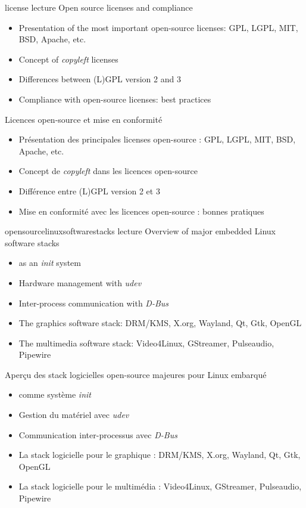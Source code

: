 {license}
{lecture}
{Open source licenses and compliance}
{
  \begin{itemize}
  \item Presentation of the most important open-source licenses: GPL,
    LGPL, MIT, BSD, Apache, etc.
  \item Concept of {\em copyleft} licenses
  \item Differences between (L)GPL version 2 and 3
  \item Compliance with open-source licenses: best practices
  \end{itemize}
}
{Licences open-source et mise en conformité}
{
  \begin{itemize}
  \item Présentation des principales licenses open-source : GPL, LGPL,
    MIT, BSD, Apache, etc.
  \item Concept de {\em copyleft} dans les licences open-source
  \item Différence entre (L)GPL version 2 et 3
  \item Mise en conformité avec les licences open-source : bonnes
    pratiques
  \end{itemize}
}
{opensourcelinuxsoftwarestacks}
{lecture}
{Overview of major embedded Linux software stacks}
{
  \begin{itemize}
  \item {} as an {\em init} system
  \item Hardware management with {\em udev}
  \item Inter-process communication with {\em D-Bus}
  \item The graphics software stack: DRM/KMS, X.org, Wayland, Qt, Gtk,
    OpenGL
  \item The multimedia software stack: Video4Linux, GStreamer,
    Pulseaudio, Pipewire
  \end{itemize}
}
{Aperçu des stack logicielles open-source majeures pour Linux embarqué}
{
  \begin{itemize}
  \item {} comme système {\em init}
  \item Gestion du matériel avec {\em udev}
  \item Communication inter-processus avec {\em D-Bus}
  \item La stack logicielle pour le graphique : DRM/KMS, X.org,
    Wayland, Qt, Gtk, OpenGL
  \item La stack logicielle pour le multimédia : Video4Linux,
    GStreamer, Pulseaudio, Pipewire
  \end{itemize}
}
